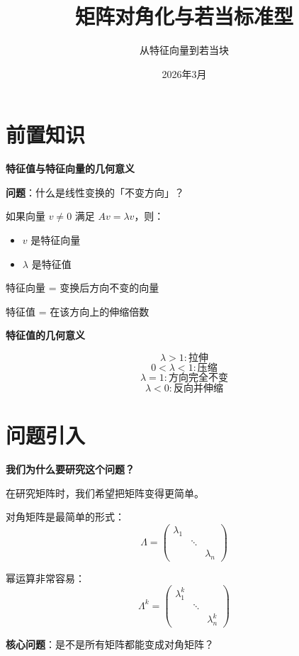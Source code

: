 \documentclass[aspectratio=169,12pt]{beamer}
\title{矩阵对角化与若当标准型}
\subtitle{从特征向量到若当块}
\author{}
\date{2026年3月}
\begin{document}
\frame{\titlepage}

\section{前置知识}

\begin{frame}
\fontsize{11}{13}\selectfont
\centerline{\textbf{特征值与特征向量的几何意义}}

\bigskip
\centerline{\textbf{问题}：什么是线性变换的「不变方向」？}

\bigskip
\pause
如果向量 $v \neq 0$ 满足 $Av = \lambda v$，则：
\begin{itemize}
    \item $v$ 是特征向量
    \item $\lambda$ 是特征值
\end{itemize}

\pause
\bigskip
特征向量 = 变换后方向不变的向量

特征值 = 在该方向上的伸缩倍数
\end{frame}

\begin{frame}
\fontsize{10}{12}\selectfont
\centerline{\textbf{特征值的几何意义}}

\[
\lambda > 1 : \text{拉伸}
\]
\[
0 < \lambda < 1 : \text{压缩}
\]
\[
\lambda = 1 : \text{方向完全不变}
\]
\[
\lambda < 0 : \text{反向并伸缩}
\]
\end{frame}

\section{问题引入}

\begin{frame}
\fontsize{11}{13}\selectfont
\centerline{\textbf{我们为什么要研究这个问题？}}

\bigskip
\centerline{在研究矩阵时，我们希望把矩阵变得更简单。}

\bigskip
\pause
对角矩阵是最简单的形式：
\[
\Lambda = \begin{pmatrix}
\lambda_1 & & \\
& \ddots & \\
& & \lambda_n
\end{pmatrix}
\]

\pause
\bigskip
幂运算非常容易：
\[
\Lambda^k = \begin{pmatrix}
\lambda_1^k & & \\
& \ddots & \\
& & \lambda_n^k
\end{pmatrix}
\]

\pause
\bigskip
\centerline{\textbf{核心问题}：是不是所有矩阵都能变成对角矩阵？}
\end{frame}
\end{document}
